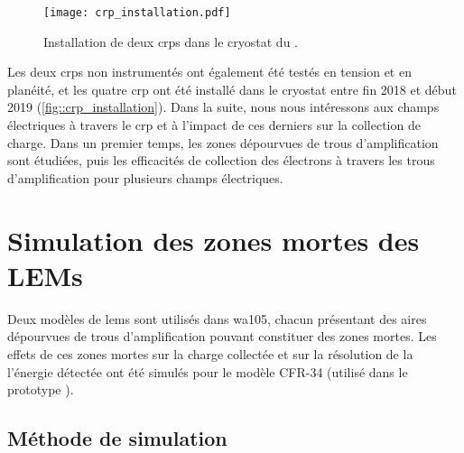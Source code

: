 
      \begin{figure}
        \centering
        \texttt{[image: crp\_installation.pdf]}
        \caption[Installation de deux CRPs dans le cryostat du \SSS{}]{\label{fig::crp_installation}Installation de deux \glspl{crp} dans le cryostat du \SSS{}.}
      \end{figure}

      Les deux \glspl{crp} non instrumentés ont également été testés en tension et en planéité, et les quatre \gls{crp} ont été installé dans le cryostat entre fin 2018 et début 2019 (\autoref{fig::crp_installation}). Dans la suite, nous nous intéressons aux champs électriques à travers le \gls{crp} et à l'impact de ces derniers sur la collection de charge. Dans un premier temps, les zones dépourvues de trous d'amplification sont étudiées, puis les efficacités de collection des électrons à travers les trous d'amplification pour plusieurs champs électriques.
        
  \section{Simulation des zones mortes des LEMs}\label{sec::dead_zones}
    
    Deux modèles de \glspl{lem} sont utilisés dans \gls{wa105}, chacun présentant des aires dépourvues de trous d'amplification pouvant constituer des zones mortes. Les effets de ces zones mortes sur la charge collectée et sur la résolution de la l'énergie détectée ont été simulés pour le modèle CFR-34 (utilisé dans le prototype \TOO{}). %
        
    \subsection{Méthode de simulation}
        
